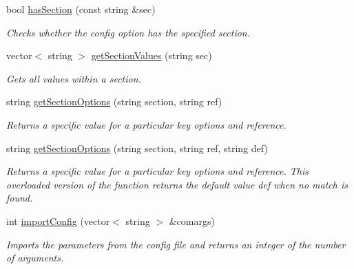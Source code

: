 \begin{DoxyCompactItemize}
bool \hyperlink{class_config_option_a3a99578bbd121d5494340388f8a3498c}{has\+Section} (const string \&sec)
\begin{DoxyCompactList}\small\item\em Checks whether the config option has the specified section. \end{DoxyCompactList}\item 
vector$<$ string $>$ \hyperlink{class_config_option_a1cd1b4a0e620ba32a4e8864346357dcd}{get\+Section\+Values} (string sec)
\begin{DoxyCompactList}\small\item\em Gets all values within a section. \end{DoxyCompactList}\item 
string \hyperlink{class_config_option_a36917196846e64db6634730fa9b2b3f3}{get\+Section\+Options} (string section, string ref)
\begin{DoxyCompactList}\small\item\em Returns a specific value for a particular key options and reference. \end{DoxyCompactList}\item 
string \hyperlink{class_config_option_a9f4884f12f74d865a3370c2f24ffcc67}{get\+Section\+Options} (string section, string ref, string def)
\begin{DoxyCompactList}\small\item\em Returns a specific value for a particular key options and reference. This overloaded version of the function returns the default value def when no match is found. \end{DoxyCompactList}\item 
int \hyperlink{class_config_option_afbd1ed9d006c8ff48d90e63a57f55e2a}{import\+Config} (vector$<$ string $>$ \&comargs)
\begin{DoxyCompactList}\small\item\em Imports the parameters from the config file and returns an integer of the number of arguments. \end{DoxyCompactList}\end{DoxyCompactItemize}

